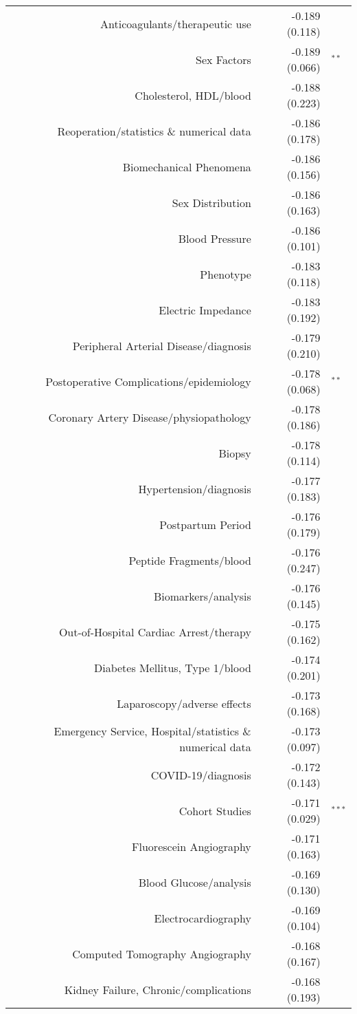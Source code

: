 \begin{longtable}[l]{rr@{}l@{ }}
Anticoagulants/therapeutic use & -0.189 (0.118) & $^{}$\\
Sex Factors & -0.189 (0.066) & $^{**}$\\
Cholesterol, HDL/blood & -0.188 (0.223) & $^{}$\\
Reoperation/statistics \& numerical data & -0.186 (0.178) & $^{}$\\
Biomechanical Phenomena & -0.186 (0.156) & $^{}$\\
Sex Distribution & -0.186 (0.163) & $^{}$\\
Blood Pressure & -0.186 (0.101) & $^{}$\\
Phenotype & -0.183 (0.118) & $^{}$\\
Electric Impedance & -0.183 (0.192) & $^{}$\\
Peripheral Arterial Disease/diagnosis & -0.179 (0.210) & $^{}$\\
Postoperative Complications/epidemiology & -0.178 (0.068) & $^{**}$\\
Coronary Artery Disease/physiopathology & -0.178 (0.186) & $^{}$\\
Biopsy & -0.178 (0.114) & $^{}$\\
Hypertension/diagnosis & -0.177 (0.183) & $^{}$\\
Postpartum Period & -0.176 (0.179) & $^{}$\\
Peptide Fragments/blood & -0.176 (0.247) & $^{}$\\
Biomarkers/analysis & -0.176 (0.145) & $^{}$\\
Out-of-Hospital Cardiac Arrest/therapy & -0.175 (0.162) & $^{}$\\
Diabetes Mellitus, Type 1/blood & -0.174 (0.201) & $^{}$\\
Laparoscopy/adverse effects & -0.173 (0.168) & $^{}$\\
Emergency Service, Hospital/statistics \& numerical data & -0.173 (0.097) & $^{}$\\
COVID-19/diagnosis & -0.172 (0.143) & $^{}$\\
Cohort Studies & -0.171 (0.029) & $^{***}$\\
Fluorescein Angiography & -0.171 (0.163) & $^{}$\\
Blood Glucose/analysis & -0.169 (0.130) & $^{}$\\
Electrocardiography & -0.169 (0.104) & $^{}$\\
Computed Tomography Angiography & -0.168 (0.167) & $^{}$\\
Kidney Failure, Chronic/complications & -0.168 (0.193) & $^{}$\\

\end{longtable}
